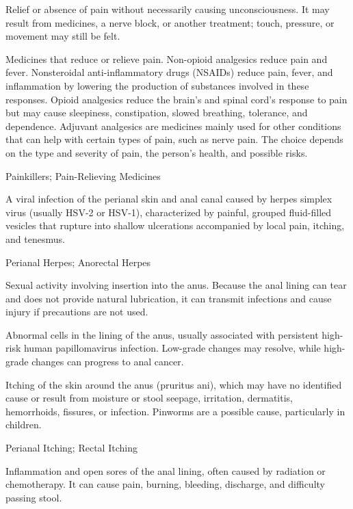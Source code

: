  Relief or absence of pain without necessarily causing unconsciousness. It may result from medicines, a nerve block, or another treatment; touch, pressure, or movement may still be felt.

 Medicines that reduce or relieve pain. Non-opioid analgesics reduce pain and fever. Nonsteroidal anti-inflammatory drugs (NSAIDs) reduce pain, fever, and inflammation by lowering the production of substances involved in these responses. Opioid analgesics reduce the brain's and spinal cord's response to pain but may cause sleepiness, constipation, slowed breathing, tolerance, and dependence. Adjuvant analgesics are medicines mainly used for other conditions that can help with certain types of pain, such as nerve pain. The choice depends on the type and severity of pain, the person's health, and possible risks.

\synonyms
Painkillers; Pain-Relieving Medicines

 A viral infection of the perianal skin and anal canal caused by herpes simplex virus (usually HSV-2 or HSV-1), characterized by painful, grouped fluid-filled vesicles that rupture into shallow ulcerations accompanied by local pain, itching, and tenesmus.

\synonyms
Perianal Herpes; Anorectal Herpes

 Sexual activity involving insertion into the anus. Because the anal lining can tear and does not provide natural lubrication, it can transmit infections and cause injury if precautions are not used.

 Abnormal cells in the lining of the anus, usually associated with persistent high-risk human papillomavirus infection. Low-grade changes may resolve, while high-grade changes can progress to anal cancer.

 Itching of the skin around the anus (pruritus ani), which may have no
identified cause or result from moisture or stool seepage, irritation, dermatitis, hemorrhoids,
fissures, or infection. Pinworms are a possible cause, particularly in children.

\synonyms
Perianal Itching; Rectal Itching

 Inflammation and open sores of the anal lining, often caused by radiation or chemotherapy. It can cause pain, burning, bleeding, discharge, and difficulty passing stool.

